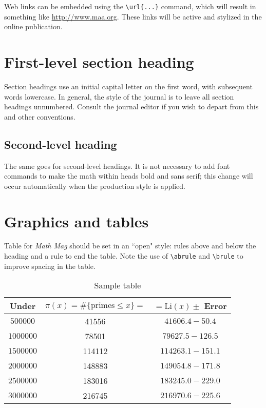 \documentclass{article}
\theoremstyle{theorem}
\theoremstyle{definition}
\begin{document}
Web links can be embedded using the \verb~\url{...}~ command, which will result in something like \url{http://www.maa.org}.  These links will be active and stylized in the online publication.

\section{First-level section heading}

Section headings use an initial capital letter on the first word, with subsequent words lowercase.  In general, the style of the journal is to leave all section headings unnumbered.  Consult the journal editor if you wish to depart from this and other conventions.

\subsection{Second-level heading}

The same goes for second-level headings.  It is not necessary to add font commands to make the math within heads bold and sans serif; this change will occur automatically when the production style is applied.

\section{Graphics and tables}

Table for  \textit{Math Mag} should be set in an ``open" style: rules above and below the heading and a rule to end the table.  Note the use of \verb~\abrule~ and \verb~\brule~ to improve spacing in the table.

\begin{table}[h]
\begin{center}
\begin{tabular}{ccc}
\hline
Under  & $\pi(x) = \#\{\text{primes} \le x\}=$ &   $=\text{Li}(x)\pm$  Error\abrule\\
\hline
$500000$  &  41556 &  $41606.4 - 50.4$ \abrule \\
$1000000$ &  78501 &  $79627.5 - 126.5$\brule \\
$1500000$ & 114112 & $114263.1 - 151.1$\brule \\
$2000000$ & 148883 & $149054.8 - 171.8$\brule \\
$2500000$ & 183016 & $183245.0 - 229.0$\brule \\
$3000000$ & 216745 & $216970.6 - 225.6 $\brule \\
\hline
\end{tabular}
\end{center}
\caption{Sample table}
\end{table}
\end{document}
